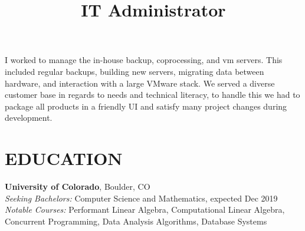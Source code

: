 \documentclass[margin]{res}
\begin{document}
\begin{resume}
\title{\textbf{IT Administrator}}
\begin{position}
I worked to manage the in-house backup, coprocessing, and vm servers. This included regular backups, building new servers, migrating data between hardware, and interaction with a large VMware stack. We served a diverse customer base in regards to needs and technical literacy, to handle this we had to package all products in a friendly UI and satisfy many project changes during development.
\end{position}

\section{EDUCATION}
\textbf{University of Colorado}, Boulder, CO\\
{\sl Seeking Bachelors:} Computer Science and Mathematics, expected Dec 2019\hfill \\
{\sl Notable Courses:} Performant Linear Algebra, Computational Linear Algebra, Concurrent Programming, Data Analysis Algorithms, Database Systems  \hfill
\end{resume}
\end{document}
